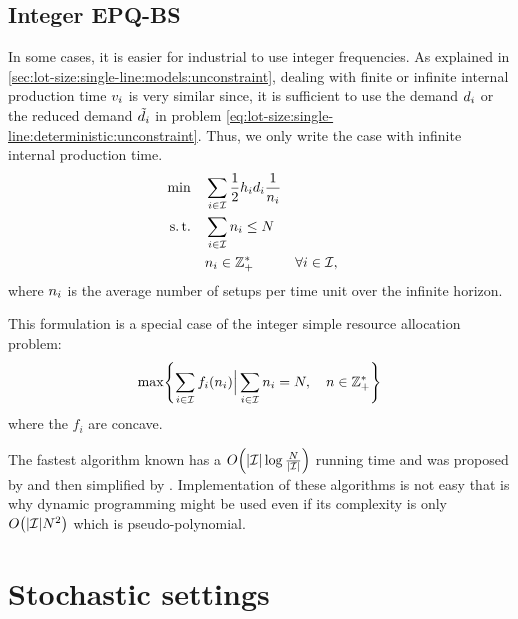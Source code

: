 


\subsection{Integer EPQ-BS}


In some cases, it is easier for industrial to use integer frequencies.
As explained in \cref{sec:lot-size:single-line:models:unconstraint}, dealing with finite or infinite internal production time $v_i$ is very similar since, it is sufficient to use the demand $d_i$ or the reduced demand $\tilde{d}_i$ in problem \eqref{eq:lot-size:single-line:deterministic:unconstraint}.
Thus, we only write the case with infinite internal production time.
\begin{subequations}\label{eq:lot-size:single-line:deterministic:integer}
  \begin{align}
  \min\quad & \displaystyle\sum_{i\in\mathcal{I}} \frac{1}{2}h_id_i\frac{1}{n_i}
  \label{eq:lot-size:single-line:deterministic:integer:objective}
  \\
  \operatorname{s.t.}\quad  & \displaystyle\sum_{i\in\mathcal{I}} n_i \le N
  \label{eq:lot-size:single-line:deterministic:integer:flexibility}
  \\
       & n_i \in \mathbb{Z}_+^* && \forall i\in\mathcal{I},
  \label{eq:lot-size:single-line:deterministic:integer:positivity}
  \end{align}
\end{subequations}
where $n_i$ is the average number of setups per time unit over the infinite horizon.


This formulation is a special case of the integer simple resource allocation problem:
\begin{equation}
  \max\crbracket{\sum_{i\in\REF} f_i\bracket{\freq_i} \Big| \sum_{i\in\REF}\freq_i=\nbsetups,\quad\freq\in \ZZ_+^*}
\end{equation}
where the $f_i$ are concave.

The fastest algorithm known has a $O\bracket{\card{\REF}\log{\frac{\nbsetups}{\card{\REF}}}}$ running time and was proposed by \cite{Frederickson1982} and then simplified by \cite{Hochbaum1994}. Implementation of these algorithms is not easy that is why dynamic programming might be used even if its complexity is only $O\bracket{\card{\REF}\nbsetups^2}$ which is pseudo-polynomial.



\section{Stochastic settings}


